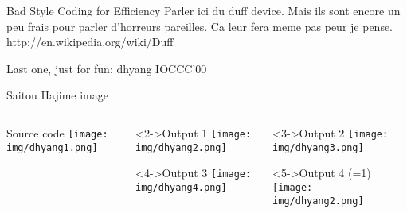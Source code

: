 \begin{frameTODO}{Bad Style Coding for Efficiency}
  Parler ici du duff device. Mais ils sont encore un peu frais pour parler
  d'horreurs pareilles. Ca leur fera meme pas peur je pense.
http://en.wikipedia.org/wiki/Duff%
\end{frameTODO}
\begin{frame}[t]{Last one, just for fun: dhyang IOCCC'00}

  \vspace{-.5\baselineskip} Saitou Hajime image \visible<2->{that prints a
    prog}  

  \medskip

  \begin{columns}
    \begin{column}{.25\linewidth}\vspace{-\baselineskip}
      \begin{block}{Source code}\medskip
        \texttt{[image: img/dhyang1.png]}        
      \end{block}
    \end{column}

    \begin{column}{.3\linewidth}\vspace{-\baselineskip}
      \begin{block}<2->{Output 1}\medskip
        \texttt{[image: img/dhyang2.png]}        
      \end{block}
      \begin{block}<4->{Output 3}\medskip
        \texttt{[image: img/dhyang4.png]}        
      \end{block}
    \end{column}

    \begin{column}{.3\linewidth}\vspace{-\baselineskip}
      \begin{block}<3->{Output 2}\medskip
        \texttt{[image: img/dhyang3.png]}        
      \end{block}
      \begin{block}<5->{Output 4 (=1)}\medskip
        \texttt{[image: img/dhyang2.png]}        
      \end{block}
    \end{column}      
  \end{columns}
\end{frame}
